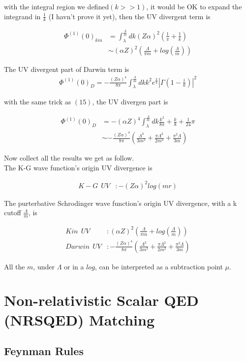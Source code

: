 \documentclass{article}
\begin{document}
with the integral region we defined$(k>>1)$, it would be OK to expand the integrand in $\frac{1}{k}$ (I havn't prove it yet), then the UV divergent term is

\begin{align}
\Phi^{(1)}(0)_{kin}&=\int_\lambda^\frac{\Lambda}{m}dk(Z\alpha)^2(\frac{1}{\pi}+\frac{1}{k})\\
&\sim(\alpha Z)^2(\frac{\Lambda}{\pi m}+log(\frac{\Lambda}{m}))
\end{align}

The UV divergent part of Darwin term is
\begin{align}
\Phi^{(1)}(0)_D=-\frac{(Z\alpha)^4}{8\pi}\int_\lambda^\frac{\Lambda}{m}dkk^2e^\frac{\pi}{k}|\Gamma(1-\frac{i}{k})|^2
\end{align}

with the same trick as $(15)$, the UV divergen part is

\begin{align}
\Phi^{(1)}(0)_{D}&=-(\alpha Z)^4\int_\lambda^\frac{\Lambda}{m}dk\frac{k^2}{8\pi}+\frac{k}{8}+\frac{1}{24}\pi\\
&\sim -\frac{(Z\alpha)^4}{8\pi}(\frac{\Lambda^3}{3m^3}+\frac{\pi\Lambda^2}{2m^2}+\frac{\pi^2\Lambda}{3m})
\end{align}

Now collect all the results we get as follow.\\
The K-G wave function's origin UV divergence is

\begin{align}
K-G\ \ UV&:-(Z\alpha)^2log(m r)
\end{align}

The purterbative Schrodinger wave function's origin UV divergence, with a k cutoff $\frac{\Lambda}{m}$, is

\begin{align}
Kin\ \  UV&:(\alpha Z)^2(\frac{\Lambda}{\pi m}+log(\frac{\Lambda}{m}))\\
Darwin\ \  UV&:-\frac{(Z\alpha)^4}{8\pi}(\frac{\Lambda^3}{3m^3}+\frac{\pi\Lambda^2}{2m^2}+\frac{\pi^2\Lambda}{3m})
\end{align}

All the $m$, under $\Lambda$ or in a $log$, can be interpreted as a subtraction point $\mu$.

\section{Non-relativistic Scalar QED (NRSQED) Matching}
\subsection{Feynman Rules}
\end{document}
